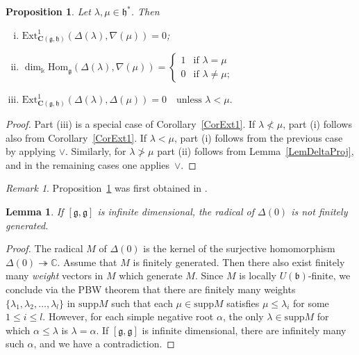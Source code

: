 \documentclass[11pt]{amsart}
\newcommand{\supp}{\mathrm{supp}}
\newcommand{\tto}{\twoheadrightarrow}
\newcommand{\bC}{\mathbf{C}}
\newcommand{\Hom}{\mathrm{Hom}}
\newcommand{\Ext}{\mathrm{Ext}}
\newcommand{\mk}{\Bbbk}
\newcommand{\fg}{\mathfrak{g}}
\newcommand{\fh}{\mathfrak{h}}
\newcommand{\fb}{\mathfrak{b}}
\newcommand{\mC}{\mathbb{C}}
\numberwithin{equation}{section}
\theoremstyle{plain}
\newtheorem{prop}[subsubsection]{Proposition}
\newtheorem{lemma}[subsubsection]{Lemma}
\theoremstyle{remark}
\newtheorem{rem}[subsubsection]{Remark}
\theoremstyle{remark}
\theoremstyle{construction}
\begin{document}
\begin{prop}\label{PropDN}
{Let} $\lambda,\mu\in\fh^\ast$. {Then}
\begin{enumerate}[(i)]
\item $\Ext^1_{\bC(\fg,\fh)}(\Delta(\lambda),\nabla(\mu))=0$;
\item $\dim_{\mk}\Hom_{\fg}(\Delta(\lambda),\nabla(\mu))=\begin{cases}1&\mbox{if $\lambda=\mu$}\\
0&\mbox{if $\lambda\not=\mu$;}
\end{cases}$
\item $\Ext^1_{\bC(\fg,\fh)}(\Delta(\lambda),\Delta(\mu))=0\quad\mbox{unless $\lambda< \mu$.}$
\end{enumerate}
\end{prop}
\begin{proof}
Part (iii) is a special case of Corollary~\ref{CorExt1}. If $\lambda\not< \mu$, part (i) follows also from Corollary~\ref{CorExt1}. If $\lambda<\mu$, part (i) follows from the previous case by applying $\vee$. Similarly, {for}  $\lambda\not>\mu$ part (ii) follows from Lemma~\ref{LemDeltaProj}, and in the remaining cases {one applies}~$\vee$.
\end{proof}

\begin{rem}
Proposition~\ref{PropDN} was first obtained in \cite[Propositions~3.8 and~3.9]{Nam}.
\end{rem}



\begin{lemma}\label{LemRad}
If $[\fg,\fg]$ is infinite dimensional, the radical of $\Delta(0)$ is not finitely generated.
\end{lemma}
\begin{proof}
The radical $M$ of $\Delta(0)$ is the  {kernel} of  {the surjective homomorphism} $\Delta(0)\tto\mC$.  {Assume that  }$M$ is finitely generated. Then there also exist finitely many {\em weight} vectors in $M$ which generate $M$. Since  $M$ is locally $U(\fb)$-finite,   {we conclude via} the PBW theorem  that there are finitely many weights $\{\lambda_1,\lambda_2,\ldots,\lambda_l\}$ in $\supp  {M}$ such that each $\mu\in \supp {M}$ satisfies $\mu\le\lambda_i$ for some $1\le i\le l$. However, for each simple negative root $\alpha$, the only $\lambda\in\supp M$ for which $\alpha\le\lambda$ is $\lambda=\alpha$. If $[\fg,\fg]$ is infinite dimensional,  {there are} infinitely many such $\alpha${,} and we  {have} a contradiction.
\end{proof}
\end{document}
